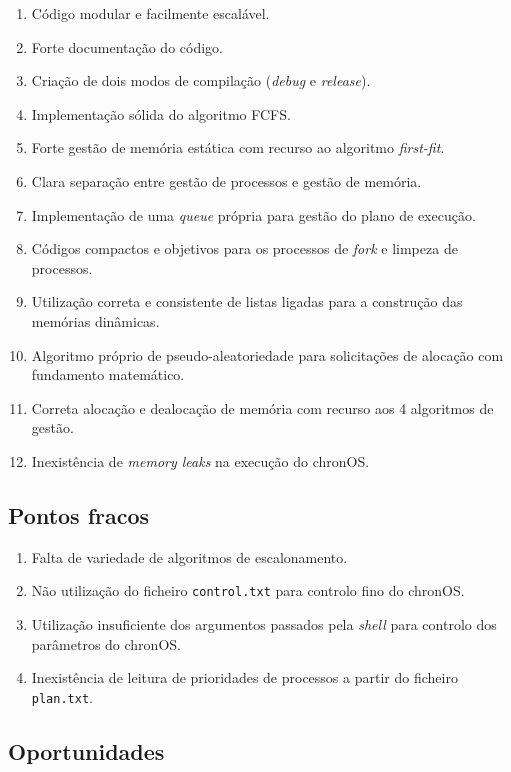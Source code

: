 \documentclass[10pt,oneside]{estiloUBI}
\newcommand{\chronOS}{\textsf{chronOS}}
\begin{document}
	\begin{enumerate}
		\item Código modular e facilmente escalável.
		\item Forte documentação do código.
		\item Criação de dois modos de compilação (\textit{debug} e \textit{release}).
		\item Implementação sólida do algoritmo \ac{FCFS}.
		\item Forte gestão de memória estática com recurso ao algoritmo \textit{first-fit}.
		\item Clara separação entre gestão de processos e gestão de memória.
		\item Implementação de uma \textit{queue} própria para gestão do plano de execução.
		\item Códigos compactos e objetivos para os processos de \textit{fork} e limpeza de processos.
		\item Utilização correta e consistente de listas ligadas para a construção das memórias dinâmicas.
		\item Algoritmo próprio de pseudo-aleatoriedade para solicitações de alocação com fundamento matemático.
		\item Correta alocação e dealocação de memória com recurso aos 4 algoritmos de gestão.
		\item Inexistência de \textit{memory leaks} na execução do \chronOS.
	\end{enumerate}
	
	
	\subsection{Pontos fracos}
	
	\begin{enumerate}
		\item Falta de variedade de algoritmos de escalonamento.
		\item Não utilização do ficheiro \verb|control.txt| para controlo fino do \chronOS.
		\item Utilização insuficiente dos argumentos passados pela \textit{shell} para controlo dos parâmetros do \chronOS.
		\item Inexistência de leitura de prioridades de processos a partir do ficheiro \verb|plan.txt|.
	\end{enumerate}
	
	
	\subsection{Oportunidades}
	
\end{document}
